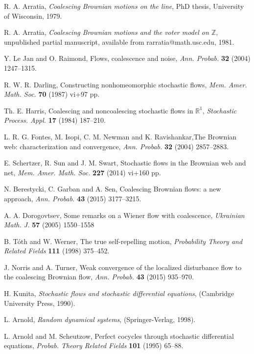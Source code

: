 \documentclass[a4paper,12pt]{article}
\newcommand{\1}{1\!\!\,{\rm I}}
\theoremstyle{plain}
\begin{document}
\begin{thebibliography}{99}
	
	 R. A. Arratia, {\it Coalescing Brownian motions on the line}, PhD thesis, University of Wisconsin, 1979.  
	
	 R. A. Arratia, {\it Coalescing Brownian motions and the voter model on $\mathbb{Z}$}, unpublished partial manuscript, available from rarratia@math.usc.edu, 1981.
	
	 Y. Le Jan and O. Raimond, Flows, coalescence and noise, {\it Ann. Probab.} {\bf 32}  (2004) 1247--1315. 
	
	
	 R. W. R. Darling, Constructing nonhomeomorphic stochastic flows, {\it 
		Mem. Amer. Math. Soc.} {\bf 70} (1987) vi+97 pp.
	
	
	 Th. E. Harris, Coalescing and noncoalescing stochastic flows in $\mathbb{R}^1$,
	{\it Stochastic Process. Appl.} {\bf 17} (1984) 187--210. 
	
	 L. R. G. Fontes, M. Isopi, C. M.  Newman and K.  Ravishankar,The Brownian web: characterization and convergence, {\it Ann. Probab.} {\bf 32} (2004) 2857--2883. 
	
	 E. Schertzer, R.  Sun and J. M.  Swart, Stochastic flows in the Brownian web and net,
	{\it Mem. Amer. Math. Soc.} {\bf  227} (2014) vi+160 pp. 
	
	 N. Berestycki, C. Garban and A. Sen, Coalescing Brownian flows: a new approach, {\it 	Ann. Probab.} {\bf 43} (2015) 3177--3215. 
	
	 A. A. Dorogovtsev, Some remarks on a Wiener flow with coalescence, {\it Ukrainian Math. J.} {\bf 57} (2005) 1550--1558 
	
	 B. T\'oth and W.  Werner,  The true self-repelling motion, {\it Probability Theory and Related Fields} {\bf 111} (1998) 375--452.
	
	 J. Norris and A. Turner,	Weak convergence of the localized disturbance flow to the coalescing Brownian flow, {\it 	Ann. Probab.} {\bf 43} (2015) 935--970. 
	
	 H. Kunita, {\it Stochastic flows and stochastic differential equations}, (Cambridge University Press, 1990).
	
	 L. Arnold, {\it Random dynamical systems}, (Springer-Verlag, 1998).
	
	
	 L. Arnold and M. Scheutzow, Perfect cocycles through stochastic differential equations, {\it Probab. Theory Related Fields} {\bf 101} (1995) 65--88. 
	

\end{thebibliography}
\end{document}
